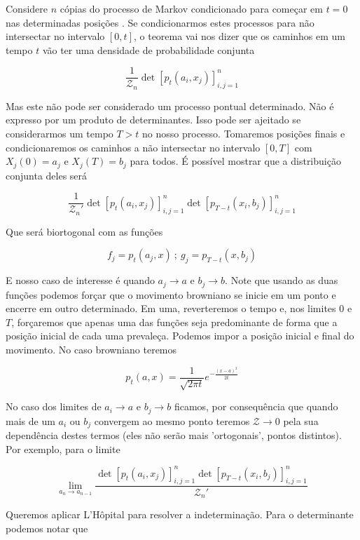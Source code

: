 Considere $n$ cópias do processo de Markov condicionado para começar em $t=0$ nas determinadas posições . Se condicionarmos estes processos para não intersectar no intervalo $[0,t]$, o teorema vai nos dizer que os caminhos em um tempo $t$ vão ter uma densidade de probabilidade conjunta

\[
	\frac{1}{\mathcal{Z}_n} \det{[p_t(a_i, x_j)]^{n}_{i,j=1}}
\]

Mas este não pode ser considerado um processo pontual determinado. Não é expresso por um produto de determinantes. Isso pode ser ajeitado se considerarmos um tempo $T > t$ no nosso processo. Tomaremos  posições finais e condicionaremos os caminhos a não intersectar no intervalo $[0, T]$ com $X_j(0) = a_j$ e $X_j(T) = b_j$ para todos. É possível mostrar que a distribuição conjunta deles será

\[
	\frac{1}{\mathcal{Z}_n'} \det{[p_t(a_i, x_j)]^{n}_{i,j=1}} \det{[p_{T-t}(x_i, b_j)]^{n}_{i,j=1}}
\]

Que será biortogonal com as funções

\[
	f_j = p_t(a_j, x) \ ; \ g_j = p_{T-t}(x, b_j)
\]

E nosso caso de interesse é quando $a_j \rightarrow a$ e $b_j \rightarrow b$. Note que usando as duas funções podemos forçar que o movimento browniano se inicie em um ponto e encerre em outro determinado. Em uma, reverteremos o tempo e, nos limites $0$ e $T$, forçaremos que apenas uma das funções seja predominante de forma que a posição inicial de cada uma prevaleça. Podemos impor a posição inicial e final do movimento. No caso browniano teremos

\[
	p_t(a, x) = \frac{1}{\sqrt{2\pi t}} e^{-\frac{(x-a)^2}{2t}}
\]

No caso dos limites de $a_i \rightarrow a$ e $b_j \rightarrow b$ ficamos, por consequência que quando mais de um $a_i$ ou $b_j$ convergem ao mesmo ponto teremos $\mathcal{Z} \rightarrow 0$ pela sua dependência destes termos (eles não serão mais 'ortogonais', pontos distintos). Por exemplo, para o limite

\[
	\lim_{a_n \rightarrow a_{n-1}} \frac{\det{[p_t(a_i, x_j)]^{n}_{i,j=1}} \det{[p_{T-t}(x_i, b_j)]^{n}_{i,j=1}}}{\mathcal{Z}_n'}
\]


Queremos aplicar L'Hôpital para resolver a indeterminação. Para o determinante podemos notar que

